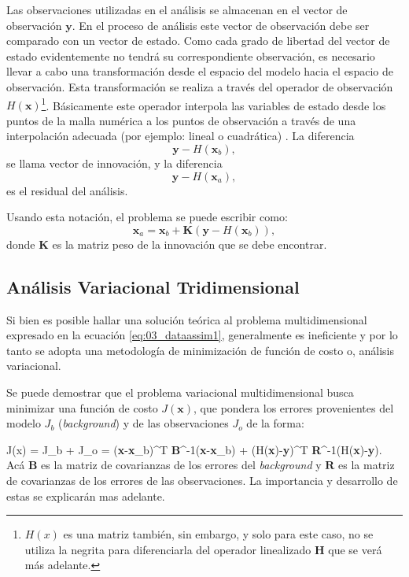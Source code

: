 Las observaciones utilizadas en el análisis se almacenan en el vector de observación $\mathbf{y}$. En el proceso de análisis este vector de observación debe ser comparado con un vector de estado. Como cada grado de libertad del vector de estado evidentemente no tendrá su correspondiente observación, es necesario llevar a cabo una transformación desde el espacio del modelo hacia el espacio de observación. Esta transformación se realiza a través del operador de observación $H(\mathbf{x})$\footnote{$H(x)$ es una matriz también, sin embargo, y solo para este caso, no se utiliza la negrita para diferenciarla del operador linealizado $\textbf{H}$ que se verá más adelante.}. Básicamente este operador interpola las variables de estado desde los puntos de la malla numérica a los puntos de observación a través de una interpolación adecuada (por ejemplo: lineal o cuadrática) . La diferencia
\begin{equation*}
	\mathbf{y}-H(\mathbf{x}_b),
\end{equation*}
se llama vector de innovación, y la diferencia
\begin{equation*}
\mathbf{y}-H(\mathbf{x}_a),
\end{equation*}
es el residual del análisis.

Usando esta notación, el problema se puede escribir como:
\begin{equation}\label{eq:03_dataassim1}
	\mathbf{x}_a = \mathbf{x}_b + \mathbf{K}(\mathbf{y} - H(\mathbf{x}_b)),
\end{equation}
donde $\mathbf{K}$ es la matriz peso de la innovación que se debe encontrar.
\subsection{Análisis Variacional Tridimensional}

Si bien es posible hallar una solución teórica al problema multidimensional expresado en la ecuación \ref{eq:03_dataassim1}, generalmente es ineficiente y por lo tanto se adopta una metodología de minimización de función de costo o, análisis variacional.

Se puede demostrar \citep{warner2010numerical} que el problema variacional multidimensional busca minimizar una función de costo $J(\mathbf{x})$, que pondera los errores provenientes del modelo $J_b$ (\emph{background}) y de las observaciones $J_o$ de la forma:

\be 
J(x) = J_b + J_o = (\textbf{x}-\textbf{x}_b)^T \textbf{B}^{-1}(\textbf{x}-\textbf{x}_b) + (H(\textbf{x})-\textbf{y})^T \textbf{R}^{-1}(H(\textbf{x})-\textbf{y}).
\ee 
Acá $\textbf{B}$ es la matriz de covarianzas de los errores del \emph{background} y $\textbf{R}$ es la matriz de covarianzas de los errores de las observaciones. La importancia y desarrollo de estas se explicarán mas adelante.


